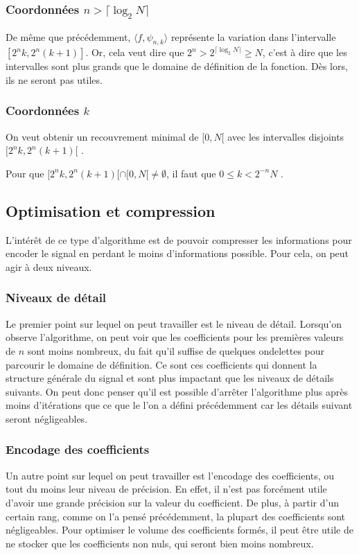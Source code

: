 \documentclass[]{article}
\theoremstyle{remark}
\theoremstyle{definition}
\begin{document}
\subsubsection{Coordonnées $n > \lceil\log_2 N\rceil$}

De même que précédemment, $\langle f,\psi_{n,k}\rangle$ représente la variation dans l'intervalle $[2^{n}k,2^{n}(k+1)]$. Or, cela veut dire que $2^n > 2^{\lceil\log_2 N\rceil}  \geqslant N$,  c'est à dire que les intervalles sont plus grands que le domaine de définition de la fonction. Dès lors, ils ne seront pas utiles.  



\subsubsection{Coordonnées $k$}

On veut obtenir un recouvrement minimal de $[0,N[$ avec les intervalles disjoints $[2^{n}k,2^{n}(k+1)[$ .

Pour que $[2^{n}k,2^{n}(k+1)[\cap[0,N[\neq\emptyset$, il faut que $0\le k< 2^{-n}N$ .







\subsection{Optimisation et compression}

L'intérêt de ce type d'algorithme est de pouvoir compresser les informations pour encoder le signal en perdant le moins d'informations possible. Pour cela, on peut agir à deux niveaux.

\subsubsection{Niveaux de détail}
	Le premier point sur lequel on peut travailler est le niveau de détail. Lorsqu'on observe l'algorithme, on peut voir que les coefficients pour les premières valeurs de $n$ sont moins nombreux, du fait qu'il suffise de quelques ondelettes pour parcourir le domaine de définition. Ce sont ces coefficients qui donnent la structure générale du signal et sont plus impactant que les niveaux de détails suivants. On peut donc penser qu'il est possible d'arrêter l'algorithme plus après moins d'itérations que ce que le l'on a défini précédemment car les détails suivant seront négligeables. 

\subsubsection{Encodage des coefficients}
	Un autre point sur lequel on peut travailler est l'encodage des coefficients, ou tout du moins leur niveau de précision. En effet, il n'est pas forcément utile d'avoir une grande précision sur la valeur du coefficient. De plus, à partir d'un certain rang, comme on l'a pensé précédemment, la plupart des coefficients sont négligeables. Pour optimiser le volume des coefficients formés, il peut être utile de ne stocker que les coefficients non nuls, qui seront bien moins nombreux. 
\end{document}

